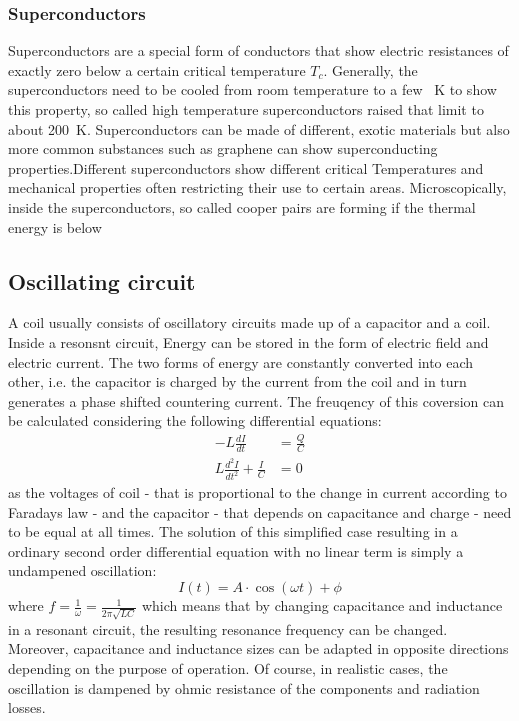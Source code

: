                 \subsubsection{Superconductors}
                Superconductors are a special form of conductors that show electric resistances of exactly zero below a certain critical temperature $T_c$. Generally, the superconductors need to be cooled from room temperature to a few \SI{}{\kelvin} to show this property, so called high temperature superconductors raised that limit to about \SI{200}{\kelvin}. Superconductors can be made of different, exotic materials but also more common substances such as graphene can show superconducting properties.Different superconductors show different critical Temperatures and mechanical properties often restricting their use to certain areas. Microscopically, inside the superconductors, so called cooper pairs are forming if the thermal energy is below 
            \subsection{Oscillating circuit}
                A coil usually consists of oscillatory circuits made up of a capacitor and a coil. Inside a resonsnt circuit, Energy can be stored in the form of electric field and electric current. The two forms of energy are constantly converted into each other, i.e. the capacitor is charged by the current from the coil and in turn generates a phase shifted countering current. The freuqency of this coversion can be calculated considering the following differential equations:
                \begin{equation}
                    \begin{aligned}
                        -L\frac{dI}{dt} &= \frac{Q}{C} \\
                        L\frac{d^2I}{dt^2} + \frac{I}{C} &= 0
                    \end{aligned}
                \end{equation}
                as the voltages of coil - that is proportional to the change in current according to Faradays law - and the capacitor - that depends on capacitance and charge - need to be equal at all times. The solution of this simplified case resulting in a ordinary second order differential equation with no linear term is simply a undampened oscillation:
                \begin{equation}
                    I(t) =  A \cdot \cos(\omega t) + \phi 
                \end{equation}
                where $f= \frac{1}{\omega} = \frac{1}{2\pi\sqrt{LC}}$ which means that by changing capacitance and inductance in a resonant circuit, the resulting resonance frequency can be changed. Moreover, capacitance and inductance sizes can be adapted in opposite directions depending on the purpose of operation.
                Of course, in realistic cases, the oscillation is dampened by ohmic resistance of the components and radiation losses. 
